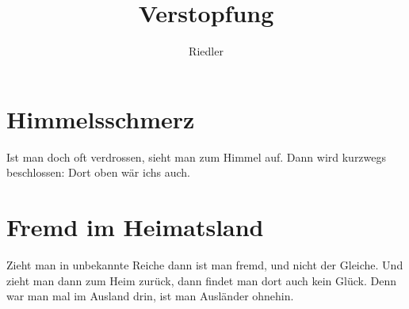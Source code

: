 \documentclass[11pt]{article}
\title{\textbf{Verstopfung}}
\author{Riedler}
\date{}
\begin{document}
\maketitle
\thispagestyle{empty}

\section*{Himmelsschmerz}

Ist man doch oft verdrossen,\newline
sieht man zum Himmel auf.\newline
Dann wird kurzwegs beschlossen:\newline
Dort oben wär ichs auch.

\section*{Fremd im Heimatsland}

Zieht man in unbekannte Reiche\newline
dann ist man fremd, und nicht der Gleiche.\newline
Und zieht man dann zum Heim zurück,\newline
dann findet man dort auch kein Glück.\newline
Denn war man mal im Ausland drin,\newline
ist man Ausländer ohnehin.
\end{document}
